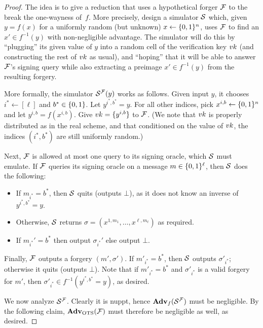 \documentclass[11pt]{article}
\begin{document}
\begin{proof}
  The idea is to give a reduction that uses a hypothetical forger
  $\mathcal{F}$ to the break the one-wayness of~$f$.  More precisely, design
  a simulator $\mathcal{S}$ which, given $y = f(x)$ for a uniformly random
  (but unknown) $x \gets \{0,1\}^{n}$, uses $\mathcal{F}$ to find an $x' \in
  f^{-1}(y)$ with non-negligible advantage.  The simulator will do
  this by ``plugging'' its given value of $y$ into a random cell of
  the verification key $vk$ (and constructing the rest of $vk$ as
  usual), and ``hoping'' that it will be able to answer $\mathcal{F}$'s
  signing query while also extracting a preimage $x' \in f^{-1}(y)$
  from the resulting forgery.

  More formally, the simulator $\mathcal{S}^{\mathcal{F}}(y)$ works as follows.
  Given input $y$, it chooses $i^* \gets [\ell]$ and $b^* \in \{0,1\}$.
  Let $y^{i^*,b^*} = y$.  For all other indices, pick $x^{i,b} \gets
  \{0,1\}^n$ and let $y^{i,b} = f(x^{i,b})$.  Give $vk = \{y^{i,b}\}$
  to $\mathcal{F}$.  (We note that $vk$ is properly distributed as in the
  real scheme, and that conditioned on the value of $vk$, the indices
  $(i^*,b^*)$ are still uniformly random.)

  Next, $\mathcal{F}$ is allowed at most one query to its signing oracle,
  which $\mathcal{S}$ must emulate.  If $\mathcal{F}$ queries its signing oracle on
  a message $m \in \{0,1\}^{\ell}$, then $\mathcal{S}$ does the following:
  \begin{itemize}
  \item If $m_{i^*} = b^*$, then $\mathcal{S}$ quits (outputs $\bot$), as it
    does not know an inverse of $y^{i^{*},b^{*}} = y$.
  \item Otherwise, $\mathcal{S}$ returns $\sigma = (x^{1,m_{1}}, \ldots,
    x^{\ell,m_{\ell}})$ as required.
  \item If $m_{i^*}' = b^*$ then output $\sigma_{i^*}'$ else output
    $\bot$.
  \end{itemize}

  Finally, $\mathcal{F}$ outputs a forgery $(m', \sigma')$.  If $m'_{i^{*}} =
  b^{*}$, then $\mathcal{S}$ outputs $\sigma'_{i^{*}}$; otherwise it quits
  (outputs $\bot$).  Note that if $m'_{i^{*}} = b^{*}$ and
  $\sigma'_{i^*}$ is a valid forgery for $m'$, then $\sigma'_{i^{*}}
  \in f^{-1}(y^{i^*,b^*} = y)$, as desired.

  We now analyze $\mathcal{S}^{\mathcal{F}}$.  Clearly it is nuppt, hence
  $\mathbf{Adv}_{f}(\mathcal{S}^{\mathcal{F}})$ must be negligible.  By the following
  claim, $\mathbf{Adv}_{\text{OTS}}(\mathcal{F})$ must therefore be negligible as well,
  as desired.


\end{proof}
\end{document}
